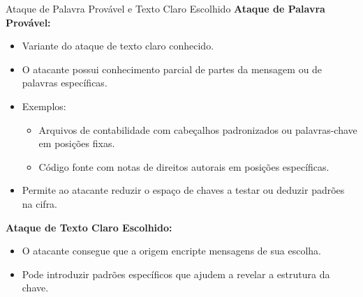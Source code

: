 \begin{frame}{Ataque de Palavra Provável e Texto Claro Escolhido}
\textbf{Ataque de Palavra Provável:}  
\begin{itemize}
    \item Variante do ataque de texto claro conhecido.  
    \item O atacante possui conhecimento parcial de partes da mensagem ou de palavras específicas.  
    \item Exemplos:  
        \begin{itemize}
            \item Arquivos de contabilidade com cabeçalhos padronizados ou palavras-chave em posições fixas.  
            \item Código fonte com notas de direitos autorais em posições específicas.  
        \end{itemize}
    \item Permite ao atacante reduzir o espaço de chaves a testar ou deduzir padrões na cifra.
\end{itemize}

\textbf{Ataque de Texto Claro Escolhido:}  
\begin{itemize}
    \item O atacante consegue que a origem encripte mensagens de sua escolha.  
    \item Pode introduzir padrões específicos que ajudem a revelar a estrutura da chave.  

\end{itemize}
\end{frame}

